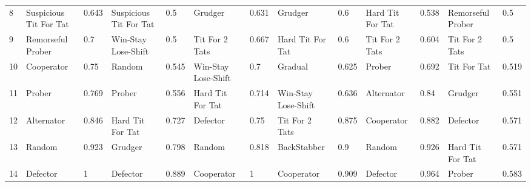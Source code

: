 \begin{tabular}{lllllllllllll}
8  &  Suspicious Tit For Tat &     0.643 &  Suspicious Tit For Tat &       0.5 &                 Grudger &     0.631 &                 Grudger &       0.6 &        Hard Tit For Tat &     0.538 &       Remorseful Prober &       0.5 \\
9  &       Remorseful Prober &       0.7 &     Win-Stay Lose-Shift &       0.5 &          Tit For 2 Tats &     0.667 &        Hard Tit For Tat &       0.6 &          Tit For 2 Tats &     0.604 &          Tit For 2 Tats &       0.5 \\
10 &              Cooperator &      0.75 &                  Random &     0.545 &     Win-Stay Lose-Shift &       0.7 &                 Gradual &     0.625 &                  Prober &     0.692 &             Tit For Tat &     0.519 \\
11 &                  Prober &     0.769 &                  Prober &     0.556 &        Hard Tit For Tat &     0.714 &     Win-Stay Lose-Shift &     0.636 &              Alternator &      0.84 &                 Grudger &     0.551 \\
12 &              Alternator &     0.846 &        Hard Tit For Tat &     0.727 &                Defector &      0.75 &          Tit For 2 Tats &     0.875 &              Cooperator &     0.882 &                Defector &     0.571 \\
13 &                  Random &     0.923 &                 Grudger &     0.798 &                  Random &     0.818 &             BackStabber &       0.9 &                  Random &     0.926 &        Hard Tit For Tat &     0.571 \\
14 &                Defector &         1 &                Defector &     0.889 &              Cooperator &         1 &              Cooperator &     0.909 &                Defector &     0.964 &                  Prober &     0.583 \\
\bottomrule
\end{tabular}
